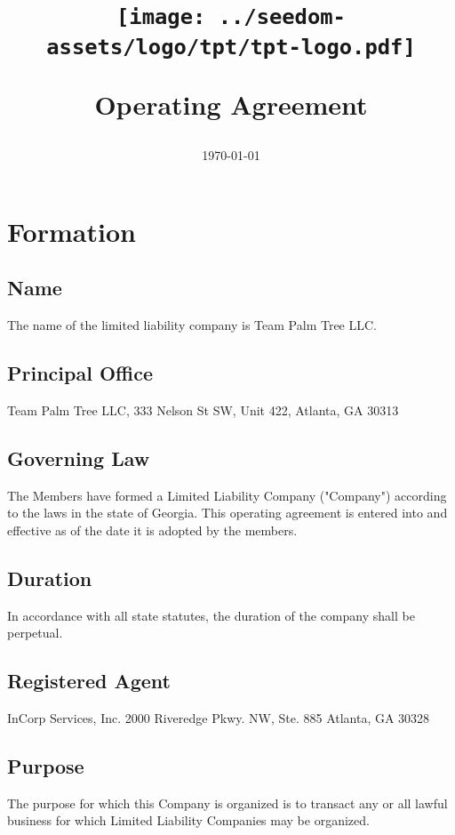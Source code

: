 \documentclass[11pt]{article}
\begin{document}
\title{%
\begin{center}
\texttt{[image: ../seedom-assets/logo/tpt/tpt-logo.pdf]}
\end{center}
\huge Operating Agreement \\[1mm]}
\date{\today}
\maketitle
\pagebreak

\tableofcontents
\pagebreak

\section{Formation}

\subsection{Name}
The name of the limited liability company is Team Palm Tree LLC.

\subsection{Principal Office}
Team Palm Tree LLC, 333 Nelson St SW, Unit 422, Atlanta, GA 30313

\subsection{Governing Law}
The Members have formed a Limited Liability Company ("Company") according to the laws in the state of Georgia. This operating agreement is entered into and effective as of the date it is adopted by the members.

\subsection{Duration}
In accordance with all state statutes, the duration of the company shall be perpetual.

\subsection{Registered Agent}
InCorp Services, Inc.
2000 Riveredge Pkwy. NW, Ste. 885
Atlanta, GA 30328

\subsection{Purpose}
The purpose for which this Company is organized is to transact any or all lawful business for which Limited Liability Companies may be organized.
\end{document}
